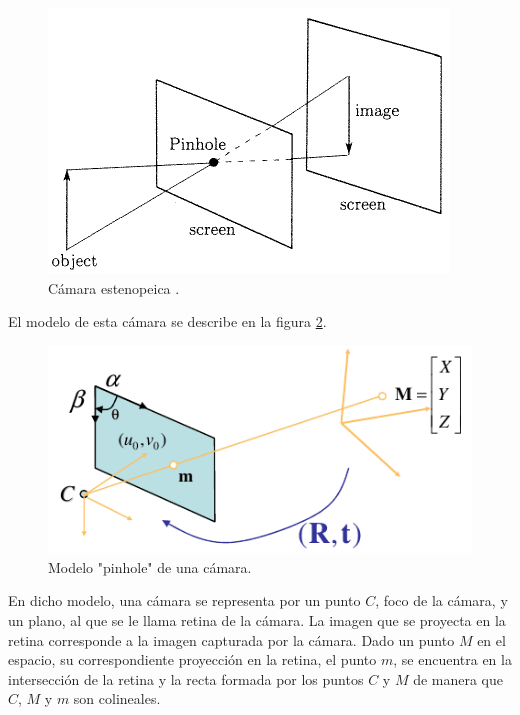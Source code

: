 \begin{figure}[h!]
\begin{center}
\includegraphics[scale=0.5]{img/calibracion/pinhole_camara.png}
\end{center}
\caption{Cámara estenopeica .\cite{faugeras_libro}}
\label{pinhole_camara}
\end{figure}


El modelo de esta cámara se describe en la figura \ref{pinhole_modelo}.\\

\begin{figure}[ht]
\begin{center}
\includegraphics[scale=0.7]{img/calibracion/pinhole_modelo.png}
\end{center}
\caption{Modelo "pinhole" de una cámara.\cite{zhang_libro}}
\label{pinhole_modelo}
\end{figure}

En dicho modelo, una cámara se representa por un punto $C$, foco de la cámara, y un plano, al  que se le llama retina de la cámara. La imagen que se proyecta en la retina corresponde a la imagen capturada por la cámara. Dado un punto $M$ en el espacio, su correspondiente proyección en la retina, el punto $m$, se encuentra en la intersección de la retina y la recta formada por los puntos $C$ y $M$ de manera que $C$, $M$ y $m$ son colineales.\\ 



